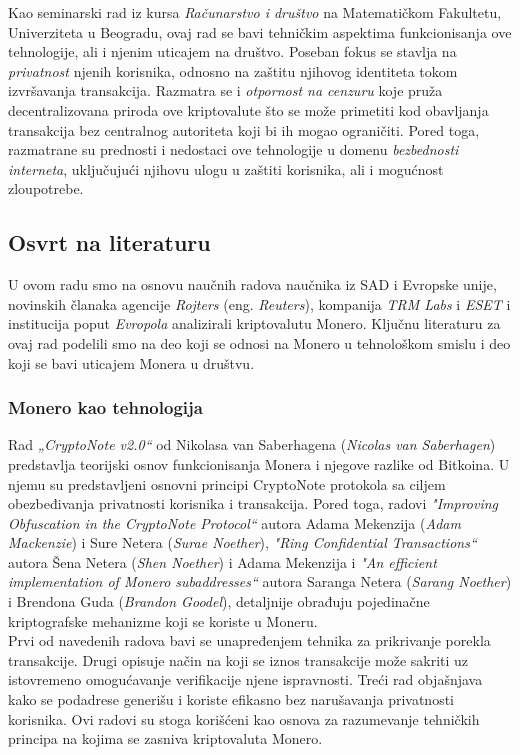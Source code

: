 \documentclass[12pt,a4paper]{article}
\begin{document}
Kao seminarski rad iz kursa \textit{Računarstvo i društvo} na Matematičkom Fakultetu, Univerziteta u Beogradu, ovaj rad se bavi tehničkim aspektima funkcionisanja ove tehnologije, ali i njenim uticajem na društvo. Poseban fokus se stavlja na \textit{privatnost} njenih korisnika, odnosno na zaštitu njihovog identiteta tokom izvršavanja transakcija. Razmatra se i \textit{otpornost na cenzuru} koje pruža decentralizovana priroda ove kriptovalute što se može primetiti kod obavljanja transakcija bez centralnog autoriteta koji bi ih mogao ograničiti. Pored toga, razmatrane su prednosti i nedostaci ove tehnologije u domenu \textit{bezbednosti interneta}, uključujući njihovu ulogu u zaštiti korisnika, ali i mogućnost zloupotrebe.

\subsection{Osvrt na literaturu}
U ovom radu smo na osnovu naučnih radova naučnika iz SAD i Evropske unije, novinskih članaka agencije \textit{Rojters} (eng. \textit{Reuters}), kompanija \textit{TRM Labs} i \textit{ESET} i institucija poput \textit{Evropola} analizirali kriptovalutu Monero. Ključnu literaturu za ovaj rad podelili smo na deo koji se odnosi na Monero u tehnološkom smislu i deo koji se bavi uticajem Monera u društvu.

\subsubsection{Monero kao tehnologija}
Rad \textit{„CryptoNote v2.0“} od Nikolasa van Saberhagena (\textit{Nicolas van Saberhagen}) ~\cite{cryptonote} predstavlja teorijski osnov funkcionisanja Monera i njegove razlike od Bitkoina. U njemu su predstavljeni osnovni principi CryptoNote protokola sa ciljem obezbeđivanja privatnosti korisnika i transakcija. Pored toga, radovi \textit{"Improving Obfuscation in the CryptoNote Protocol“} autora Adama Mekenzija (\textit{Adam Mackenzie}) i Sure Netera (\textit{Surae Noether}), \textit{"Ring Confidential Transactions“} autora Šena Netera (\textit{Shen Noether}) i Adama Mekenzija i \textit{"An efficient implementation of Monero subaddresses“} autora Saranga Netera (\textit{Sarang Noether}) i Brendona Guda (\textit{Brandon Goodel}), detaljnije obrađuju pojedinačne kriptografske mehanizme koji se koriste u Moneru. \\
Prvi od navedenih radova bavi se unapređenjem tehnika za prikrivanje porekla transakcije. Drugi opisuje način na koji se iznos transakcije može sakriti uz istovremeno omogućavanje verifikacije njene ispravnosti. Treći rad objašnjava kako se podadrese generišu i koriste efikasno bez narušavanja privatnosti korisnika. Ovi radovi su stoga korišćeni kao osnova za razumevanje tehničkih principa na kojima se zasniva kriptovaluta Monero.
\end{document}

